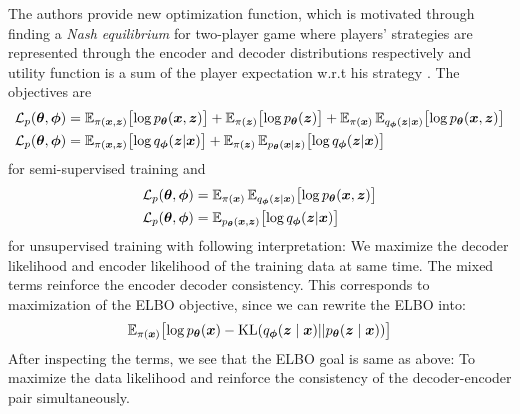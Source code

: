 The authors provide new optimization function, which is motivated through finding a \textit{Nash equilibrium} for two-player game 
where players' strategies are represented through the encoder and decoder distributions respectively and utility function is
a sum of the player expectation w.r.t his strategy \cite{sym-learning-2023}. 
The objectives are 
\begin{align*}
    \mathcal{L}_{p}(\boldsymbol{\theta},\boldsymbol{\phi}) &= \operatorname{\mathbb{E}}_{\pi(\boldsymbol{x},\boldsymbol{z})}\bigl[\log p_{\boldsymbol{\theta}}(\boldsymbol{x},\boldsymbol{z})\bigr]+
                    \operatorname{\mathbb{E}}_{\pi(\boldsymbol{z})}\bigl[\log p_{\boldsymbol{\theta}}(\boldsymbol{z})\bigr] +
                    \operatorname{\mathbb{E}}_{\pi(\boldsymbol{x})}\operatorname{\mathbb{E}}_{q_{\boldsymbol{\phi}}(\boldsymbol{z} |\boldsymbol{x})}\bigl[\log p_{\boldsymbol{\theta}}(\boldsymbol{x},\boldsymbol{z})\bigr]\\
    \mathcal{L}_{p}(\boldsymbol{\theta},\boldsymbol{\phi}) &= \operatorname{\mathbb{E}}_{\pi(\boldsymbol{x},\boldsymbol{z})}\bigl[\log q_{\boldsymbol{\phi}}(\boldsymbol{z} | \boldsymbol{x})\bigr] + 
    \operatorname{\mathbb{E}}_{\pi(\boldsymbol{z})}\operatorname{\mathbb{E}}_{p_{\boldsymbol{\theta}}(\boldsymbol{x} |\boldsymbol{z})} \bigl[\log q_{\boldsymbol{\phi}}(\boldsymbol{z} | \boldsymbol{x})\bigr]
\end{align*}
for semi-supervised training and 
\begin{align}
    \mathcal{L}_{p}(\boldsymbol{\theta},\boldsymbol{\phi}) &= \operatorname{\mathbb{E}}_{\pi(\boldsymbol{x})}\operatorname{\mathbb{E}}_{q_{\boldsymbol{\phi}}(\boldsymbol{z} |\boldsymbol{x})}\bigl[\log p_{\boldsymbol{\theta}}(\boldsymbol{x},\boldsymbol{z})\bigr] \label{eq:unsup_objective_theta}\\
    \mathcal{L}_{p}(\boldsymbol{\theta},\boldsymbol{\phi}) &= \operatorname{\mathbb{E}}_{p_{\boldsymbol{\theta}}(\boldsymbol{x},\boldsymbol{z})} \bigl[\log q_{\boldsymbol{\phi}}(\boldsymbol{z} | \boldsymbol{x})\bigr] \label{eq:unsup_objective_phi}
\end{align}
for unsupervised training with following interpretation: We maximize the decoder likelihood and encoder likelihood of the training data at same time. The mixed 
terms reinforce the encoder decoder consistency. This corresponds to maximization of the ELBO objective, since we can 
rewrite the ELBO into:
$$
\operatorname{\mathbb{E}}_{\pi(\boldsymbol{x})} \bigl[ 
\log p_{\boldsymbol{\theta}}(\boldsymbol{x}) - \mathrm{KL} (q_{\boldsymbol{\phi}}(\boldsymbol{z} \mid \boldsymbol{x}) || 
p_{\boldsymbol{\theta}}(\boldsymbol{z} \mid \boldsymbol{x})) \bigr]
$$
After inspecting the terms, we see that the ELBO goal is same as above: To maximize the data likelihood and reinforce the consistency of the decoder-encoder pair 
simultaneously. 
